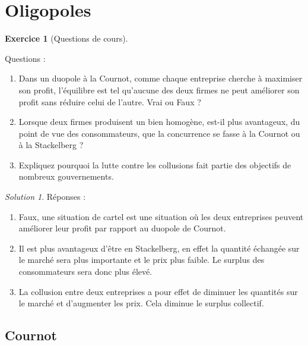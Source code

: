\documentclass[
]{book}
\providecommand{\tightlist}{%
  \setlength{\itemsep}{0pt}\setlength{\parskip}{0pt}}
\theoremstyle{definition}
\theoremstyle{definition}
\theoremstyle{definition}
\newtheorem{exercise}{Exercice}[chapter]
\theoremstyle{definition}
\theoremstyle{remark}
\newtheorem*{solution}{Solution}
\begin{document}
\hypertarget{oligopoles-2}{%
\section{Oligopoles}\label{oligopoles-2}}

\begin{exercise}[Questions de cours]
\protect\hypertarget{exr:oligopolequestions}{}\label{exr:oligopolequestions}

Questions :

\begin{enumerate}
\def\labelenumi{\arabic{enumi}.}
\tightlist
\item
  Dans un duopole à la Cournot, comme chaque entreprise
  cherche à maximiser son profit, l'équilibre est tel qu'aucune des
  deux firmes ne peut améliorer son profit sans réduire celui de
  l'autre. Vrai ou Faux ?
\item
  Lorsque deux firmes produisent un bien homogène, est-il
  plus avantageux, du point de vue des consommateurs, que la
  concurrence se fasse à la Cournot ou à la Stackelberg ?
\item
  Expliquez pourquoi la lutte contre les collusions fait
  partie des objectifs de nombreux gouvernements.
\end{enumerate}

\end{exercise}

\begin{solution}

Réponses :

\begin{enumerate}
\def\labelenumi{\arabic{enumi}.}
\tightlist
\item
  Faux, une situation de cartel est une situation où les deux entreprises peuvent améliorer leur profit par rapport au duopole de Cournot.
\item
  Il est plus avantageux d'être en Stackelberg, en effet la quantité échangée sur le marché sera plus importante et le prix plus faible.
  Le surplus des consommateurs sera donc plus élevé.
\item
  La collusion entre deux entreprises a pour effet de diminuer les quantités sur le marché et d'augmenter les prix.
  Cela diminue le surplus collectif.
\end{enumerate}

\end{solution}

\hypertarget{cournot}{%
\subsection{Cournot}\label{cournot}}
\end{document}
